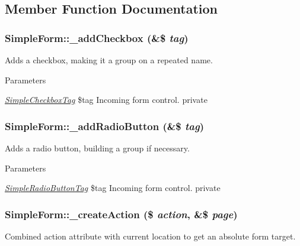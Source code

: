 \subsection{Member Function Documentation}
\hypertarget{class_simple_form_a40b3b65cc11fa065ca614957b4681cd9}{
\subsubsection[{\_\-addCheckbox}]{\setlength{\rightskip}{0pt plus 5cm}SimpleForm::\_\-addCheckbox (\&\$ {\em tag})}}
\label{class_simple_form_a40b3b65cc11fa065ca614957b4681cd9}
Adds a checkbox, making it a group on a repeated name. 
\begin{DoxyParams}{Parameters}
\item[{\em \hyperlink{class_simple_checkbox_tag}{SimpleCheckboxTag}}]\$tag Incoming form control.  private \end{DoxyParams}
\hypertarget{class_simple_form_a2e1959d83a6d33aa5375686ab45d530f}{
\subsubsection[{\_\-addRadioButton}]{\setlength{\rightskip}{0pt plus 5cm}SimpleForm::\_\-addRadioButton (\&\$ {\em tag})}}
\label{class_simple_form_a2e1959d83a6d33aa5375686ab45d530f}
Adds a radio button, building a group if necessary. 
\begin{DoxyParams}{Parameters}
\item[{\em \hyperlink{class_simple_radio_button_tag}{SimpleRadioButtonTag}}]\$tag Incoming form control.  private \end{DoxyParams}
\hypertarget{class_simple_form_acdee355185aed8489c2f20004248a463}{
\subsubsection[{\_\-createAction}]{\setlength{\rightskip}{0pt plus 5cm}SimpleForm::\_\-createAction (\$ {\em action}, \/  \&\$ {\em page})}}
\label{class_simple_form_acdee355185aed8489c2f20004248a463}
Combined action attribute with current location to get an absolute form target. 
